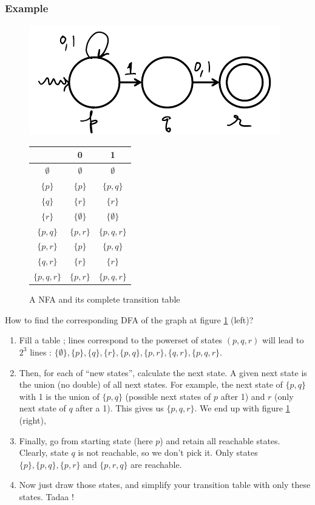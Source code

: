 \documentclass[12pt,a4paper]{article}
\newcommand{\<}{\langle}
\renewcommand{\>}{\rangle}
\begin{document}
\subsubsection{Example}
\begin{figure}
    \begin{floatrow}
        \centering
        \includegraphics[scale=0.5]{images/nfa_dfa}
        \begin{tabular}{|c|c|c|}
            \hline
        	                & 0                & 1 \\
            \hline
            $\emptyset$     & $\emptyset$      & $\emptyset$ \\
            $\{p\}$         & $\{p\}$     	   & $\{p, q\}$\\ 
            $\{q\}$ 	& $\{r\}$  	   & $\{r\}$ \\
            $\{r\}$ 	& $\{\emptyset\}$  & $\{\emptyset\}$\\ 
            $\{p, q\}$ 	& $\{p, r\}$  	   & $\{p, q, r\}$\\ 
            $\{p, r\}$ 	& $\{p\}$  	   & $\{p, q\}$\\ 
            $\{q, r\}$ 	& $\{r\}$  	   & $\{r\}$ \\
            $\{p, q, r\}$ 	& $\{p, r\}$  	   & $\{p, q, r\}$ \\
            \hline
        \end{tabular}
    \end{floatrow}
    \caption{A NFA and its complete transition table}
    \label{fig: nfa to dfa}
\end{figure}
How to find the corresponding DFA of the graph at figure \ref{fig: nfa to dfa} (left)?  
\begin{enumerate}
    \item Fill a table ; lines correspond to the powerset of states $(p,q,r)$ will lead to $2^3$ lines : $\{\emptyset\}, \{p\}, \{q\}, \{r\}, \{p,q\}, \{p,r\}, \{q,r\}, \{p,q,r\}$.
    \item Then, for each of ``new states'', calculate the next state. A given next state is the union (no double) of all next states. For example, the next state of $\{p,q\}$ with 1 is the union of $\{p,q\}$ (possible next states of $p$ after 1) and $r$ (only next state of $q$ after a 1). This gives us $\{p,q,r\}$. We end up with figure \ref{fig: nfa to dfa} (right),
    \item Finally, go from starting state (here $p$) and retain all reachable states. Clearly, state $q$ is not reachable, so we don't pick it. Only states $\{p\}, \{p,q\}, \{p,r\}$ and $\{p,r,q\}$ are reachable. 
    \item Now just draw those states, and simplify your transition table with only these states. Tadaa !
\end{enumerate}
\end{document}
